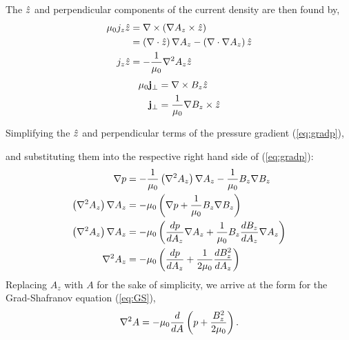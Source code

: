 \noindent The $\hat{z}$ and perpendicular components of the current density are then found by,
\begin{equation}
    \begin{split}
        \mu_0 j_z\hat{z} &= \nabla \times\left( \nabla A_z\times\hat{z} \right) \\
        &= \left( \nabla \cdot\hat{z} \right)\nabla A_z - \left( \nabla \cdot\nabla A_z \right)\hat{z} \\
       j_z\hat{z} &= -\frac{1}{\mu_0}\nabla^2 A_z\hat{z} \\
    \end{split}
    \label{eq:jz}
\end{equation}
\begin{equation}
    \begin{split}
        \mu_0\jvec_\perp &= \delcross B_z\zhat \\
        \jvec_\perp &= \frac{1}{\mu_0}\grad B_z\cross\zhat \\
    \end{split}
    \label{{eq:jperp}}
\end{equation}

\noindent Simplifying the $\hat{z}$ and perpendicular terms of the pressure gradient (\ref{eq:gradp}),

\noindent and substituting them into the respective right hand side of (\ref{eq:gradp}):
\[
    \begin{split}
        \nabla p &= -\frac{1}{\mu_0}\left( \nabla^2 A_z \right)\nabla A_z - \frac{1}{\mu_0}B_z\nabla B_z \\
        \left( \nabla^2 A_z \right)\nabla A_z &= -\mu_0\left( \nabla p+ \frac{1}{\mu_0}B_z\nabla B_z \right) \\
        \left( \nabla^2 A_z \right)\nabla A_z &= -\mu_0 \left( \frac{d p}{d A_z}\nabla A_z + \frac{1}{\mu_0}B_z\frac{d B_z}{d A_z}\nabla A_z \right) \\
        \nabla^2 A_z &= -\mu_0\left( \frac{d p}{d A_z} + \frac{1}{2\mu_0}\frac{d B_z^2}{d A_z} \right) \\
    \end{split}
\]
Replacing $A_z$ with $A$ for the sake of simplicity, we arrive at the form for the Grad-Shafranov equation (\ref{eq:GS}),
\begin{equation}
    \nabla^2 A = -\mu_0\frac{d }{d A}\left( p + \frac{B_z^2}{2\mu_0} \right).
    \label{eq:gradp2}
\end{equation}

